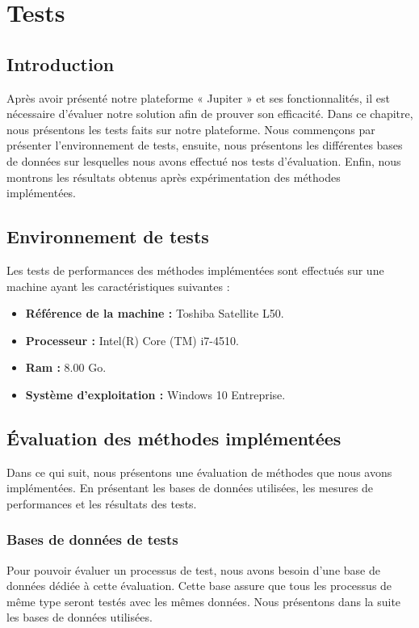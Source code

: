\chapter{Tests}
\section{Introduction}
\tab Après avoir présenté notre plateforme « Jupiter » et ses fonctionnalités, il est nécessaire d’évaluer notre solution afin de prouver son efficacité.
Dans ce chapitre, nous présentons les tests faits sur notre plateforme. Nous commençons par présenter l'environnement de tests, ensuite, nous présentons les différentes bases de données sur lesquelles nous avons effectué nos tests d’évaluation. Enfin, nous montrons les résultats obtenus après expérimentation des méthodes implémentées. 
\section{Environnement de tests}
Les tests de performances des méthodes implémentées sont effectués sur une machine ayant les caractéristiques suivantes :
\begin{itemize}
	\item \textbf{Référence de la machine :} Toshiba Satellite L50. 
	\item \textbf{Processeur :} Intel(R) Core (TM) i7-4510. 
	\item \textbf{Ram :} 8.00 Go. 
	\item \textbf{Système d’exploitation :} Windows 10 Entreprise.
\end{itemize} 
 
\section{Évaluation des méthodes implémentées}
Dans ce qui suit, nous présentons une évaluation de méthodes que nous avons implémentées. En présentant les bases de données utilisées, les mesures de performances et les résultats des tests.
\subsection{Bases de données de tests }
Pour pouvoir évaluer un processus de test, nous avons besoin d’une base de données dédiée à cette évaluation. Cette base assure que tous les processus de même type seront testés avec les mêmes données. Nous présentons dans la suite les bases de données utilisées.
